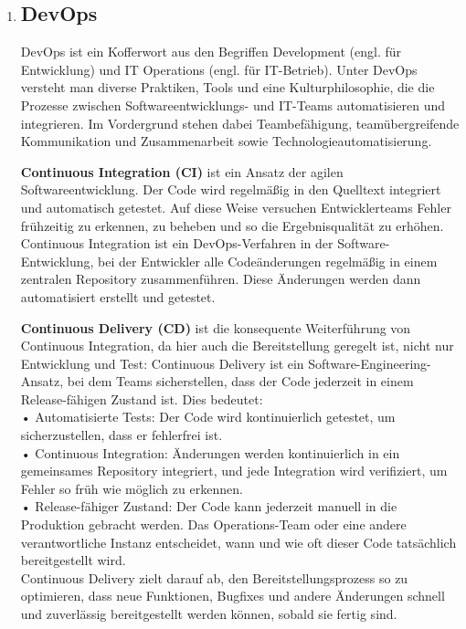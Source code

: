 \documentclass{article}
\begin{document}
\begin{enumerate}[label=\alph*)]
   
   
   \item \subsection*{DevOps}
   DevOps ist ein Kofferwort aus den Begriffen Development (engl. für Entwicklung) und IT Operations (engl. für IT-Betrieb).
   Unter DevOps versteht man diverse Praktiken, Tools und eine Kulturphilosophie, die die Prozesse zwischen Softwareentwicklungs- und IT-Teams automatisieren und integrieren. Im Vordergrund stehen dabei Teambefähigung, teamübergreifende Kommunikation und Zusammenarbeit sowie Technologieautomatisierung.
   
   \textbf{Continuous Integration (CI)} ist ein Ansatz der agilen Softwareentwicklung. Der Code wird regelmäßig in den Quelltext integriert und automatisch getestet. Auf diese Weise versuchen Entwicklerteams Fehler frühzeitig zu erkennen, zu beheben und so die Ergebnisqualität zu erhöhen.
   Continuous Integration ist ein DevOps-Verfahren in der Software-Entwicklung, bei der Entwickler alle Codeänderungen regelmäßig in einem zentralen Repository zusammenführen. Diese Änderungen werden dann automatisiert erstellt und getestet.
   
    \textbf{Continuous Delivery (CD)} ist die konsequente Weiterführung von Continuous Integration, da hier auch die Bereitstellung geregelt ist, nicht nur Entwicklung und Test: 
Continuous Delivery ist ein Software-Engineering-Ansatz, bei dem Teams sicherstellen, dass der Code jederzeit in einem Release-fähigen Zustand ist. Dies bedeutet:\\
• Automatisierte Tests: Der Code wird kontinuierlich getestet, um sicherzustellen, dass er fehlerfrei ist.\\
• Continuous Integration: Änderungen werden kontinuierlich in ein gemeinsames Repository integriert, und jede Integration wird verifiziert, um Fehler so früh wie möglich zu erkennen.\\
• Release-fähiger Zustand: Der Code kann jederzeit manuell in die Produktion gebracht werden. Das Operations-Team oder eine andere verantwortliche Instanz entscheidet, wann und wie oft dieser Code tatsächlich bereitgestellt wird.\\
Continuous Delivery zielt darauf ab, den Bereitstellungsprozess so zu optimieren, dass neue Funktionen, Bugfixes und andere Änderungen schnell und zuverlässig bereitgestellt werden können, sobald sie fertig sind.\\


\end{enumerate}
\end{document}
